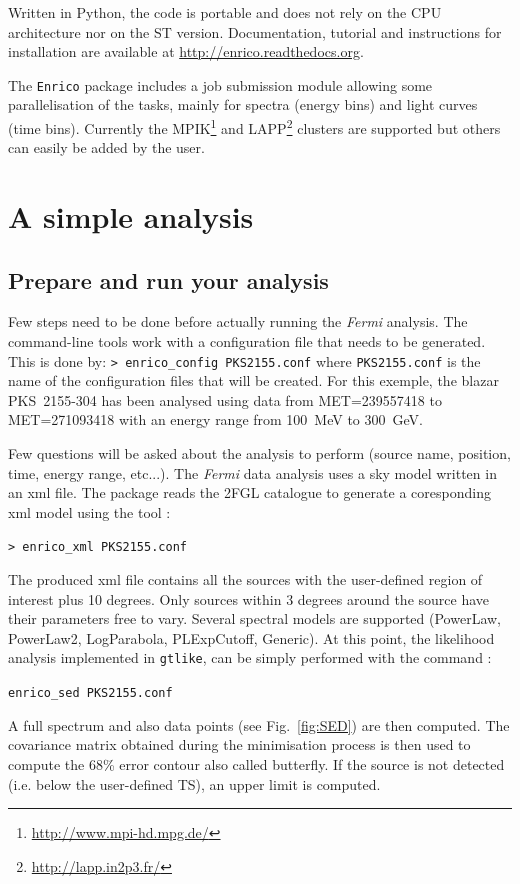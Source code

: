 \documentclass[a4paper]{article}
\newcommand{\Fermi}{\textit{Fermi} }
\begin{document}
Written in Python, the code is portable and does not rely on the CPU architecture nor on the ST version. Documentation, tutorial and instructions for installation are available at \url{http://enrico.readthedocs.org}. 

The {\tt Enrico} package includes a job submission module allowing some parallelisation of the tasks, mainly for spectra (energy bins) and light curves (time bins). Currently the MPIK\footnote{\url{http://www.mpi-hd.mpg.de/}} and LAPP\footnote{\url{http://lapp.in2p3.fr/}} clusters are supported but others can easily be added by the user.

\section{A simple analysis}

\subsection{Prepare and run your analysis}

Few steps need to be done before actually running the \Fermi analysis. The command-line tools work with a configuration file that needs to be generated. This is done by:
\mbox{{\tt> enrico\_config PKS2155.conf}} 
where {\tt PKS2155.conf} is the name of the configuration files that will be created. For this exemple, the blazar PKS~2155-304 has been analysed using data from MET=239557418 to MET=271093418 with an energy range from 100~MeV to 300~GeV.

Few questions will be asked about the analysis to perform (source name, position, time, energy range, etc...). The \Fermi data analysis uses a sky model written in an xml file. The package reads the 2FGL catalogue \cite{2012ApJS..199...31N} to generate a coresponding xml model using the tool :

\mbox{{\tt> enrico\_xml PKS2155.conf}}

The produced xml file contains all the sources with the user-defined region of interest plus 10 degrees. Only sources within 3 degrees around the source have their parameters free to vary. Several spectral models are supported (PowerLaw, PowerLaw2, LogParabola, PLExpCutoff, Generic). At this point, the likelihood analysis implemented in {\tt gtlike}, can be simply performed with the command :

\mbox{{\tt enrico\_sed PKS2155.conf}}

A full spectrum and also data points (see Fig.~\ref{fig:SED}) are then computed. The covariance matrix obtained during the minimisation process is then used to compute the 68\% error contour also called butterfly. If the source is not detected (i.e. below the user-defined TS), an upper limit is computed.
\end{document}

